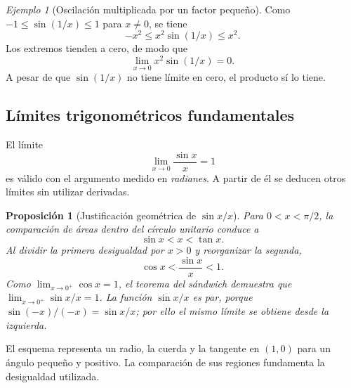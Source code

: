 \documentclass[12pt]{article}
\newtheorem{proposicion}[definicion]{Proposición}
\theoremstyle{remark}
\newtheorem{ejemplo}{Ejemplo}
\begin{document}
\begin{ejemplo}[Oscilación multiplicada por un factor pequeño]
Como $-1\le\sin(1/x)\le1$ para $x\ne0$, se tiene
\[
 -x^2\le x^2\sin(1/x)\le x^2.
\]
Los extremos tienden a cero, de modo que
\[
 \boxed{\lim_{x\to0}x^2\sin(1/x)=0.}
\]
A pesar de que $\sin(1/x)$ no tiene límite en cero, el producto sí lo tiene.
\end{ejemplo}

\subsection*{Límites trigonométricos fundamentales}
El límite
\[
 \boxed{\lim_{x\to0}\frac{\sin x}{x}=1}
\]
es válido con el argumento medido en \emph{radianes}. A partir de él se deducen otros límites sin utilizar derivadas.

\begin{proposicion}[Justificación geométrica de $\sin x/x$]
Para $0<x<\pi/2$, la comparación de áreas dentro del círculo unitario conduce a
\[
 \sin x<x<\tan x.
\]
Al dividir la primera desigualdad por $x>0$ y reorganizar la segunda,
\[
 \cos x<\frac{\sin x}{x}<1.
\]
Como $\lim_{x\to0^+}\cos x=1$, el teorema del sándwich demuestra que $\lim_{x\to0^+}\sin x/x=1$. La función $\sin x/x$ es par, porque $\sin(-x)/(-x)=\sin x/x$; por ello el mismo límite se obtiene desde la izquierda.
\end{proposicion}

\begin{center}
\end{center}
El esquema representa un radio, la cuerda y la tangente en $(1,0)$ para un ángulo pequeño y positivo. La comparación de sus regiones fundamenta la desigualdad utilizada.
\end{document}
